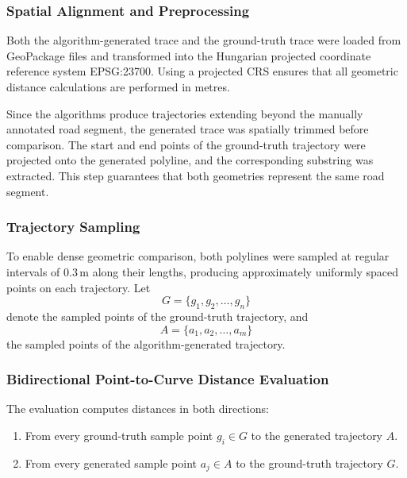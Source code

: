 \subsubsection{Spatial Alignment and Preprocessing}

Both the algorithm-generated trace and the ground-truth trace were loaded from GeoPackage files and transformed into the Hungarian projected coordinate reference system EPSG:23700. Using a projected CRS ensures that all geometric distance calculations are performed in metres.

Since the algorithms produce trajectories extending beyond the manually annotated road segment, the generated trace was spatially trimmed before comparison. The start and end points of the ground-truth trajectory were projected onto the generated polyline, and the corresponding substring was extracted. This step guarantees that both geometries represent the same road segment.

\subsubsection{Trajectory Sampling}

To enable dense geometric comparison, both polylines were sampled at regular intervals of $0.3\,\mathrm{m}$ along their lengths, producing approximately uniformly spaced points on each trajectory. Let
\begin{equation}
  G = \{g_1, g_2, \dots, g_n\}
  \label{eq:gt_samples}
\end{equation}
denote the sampled points of the ground-truth trajectory, and
\begin{equation}
  A = \{a_1, a_2, \dots, a_m\}
  \label{eq:algo_samples}
\end{equation}
the sampled points of the algorithm-generated trajectory.

\subsubsection{Bidirectional Point-to-Curve Distance Evaluation}

The evaluation computes distances in both directions:
\begin{enumerate}
  \item From every ground-truth sample point $g_i \in G$ to the generated trajectory $A$.
  \item From every generated sample point $a_j \in A$ to the ground-truth trajectory $G$.
\end{enumerate}

